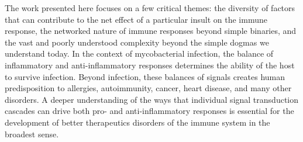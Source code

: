 The work presented here focuses on a few critical themes: the diversity of factors that can contribute to the net effect of a particular insult on the immune response, the networked nature of immune responses beyond simple binaries, and the vast and poorly understood complexity beyond the simple dogmas we understand today. In the context of mycobacterial infection, the balance of inflammatory and anti-inflammatory responses determines the ability of the host to survive infection. Beyond infection, these balances of signals creates human predisposition to allergies, autoimmunity, cancer, heart disease, and many other disorders. A deeper understanding of the ways that individual signal transduction cascades can drive both pro- and anti-inflammatory responses is essential for the development of better therapeutics disorders of the immune system in the broadest sense.






